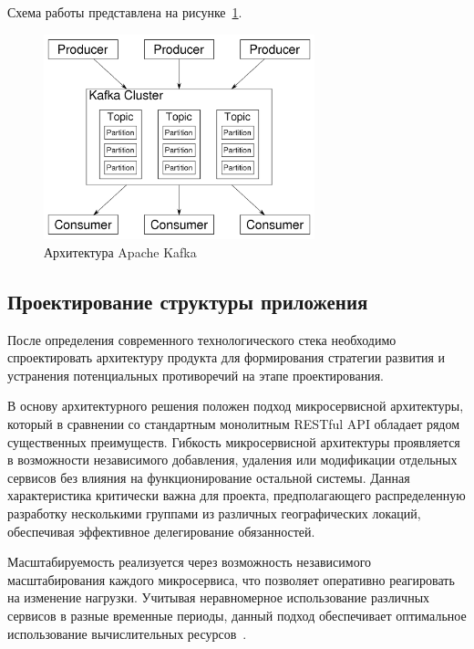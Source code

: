 Схема работы представлена на рисунке~\ref{fig:kafka_architecture}.
\begin{figure}[htbp]
    \centering
    \includegraphics[width=0.7\textwidth]{Dissertation/images/kafka_scheme}
    \caption{Архитектура Apache Kafka}
    \label{fig:kafka_architecture}
\end{figure}

\subsection{Проектирование структуры приложения}

После определения современного технологического стека необходимо спроектировать архитектуру продукта для формирования стратегии развития и устранения потенциальных противоречий на этапе проектирования.

В основу архитектурного решения положен подход микросервисной архитектуры, который в сравнении со стандартным монолитным RESTful API обладает рядом существенных преимуществ.
Гибкость микросервисной архитектуры проявляется в возможности независимого добавления, удаления или модификации отдельных сервисов без влияния на функционирование остальной системы. Данная характеристика критически важна для проекта, предполагающего распределенную разработку несколькими группами из различных географических локаций, обеспечивая эффективное делегирование обязанностей.

Масштабируемость реализуется через возможность независимого масштабирования каждого микросервиса, что позволяет оперативно реагировать на изменение нагрузки. Учитывая неравномерное использование различных сервисов в разные временные периоды, данный подход обеспечивает оптимальное использование вычислительных ресурсов~\cite{15_dragoni2017}.

